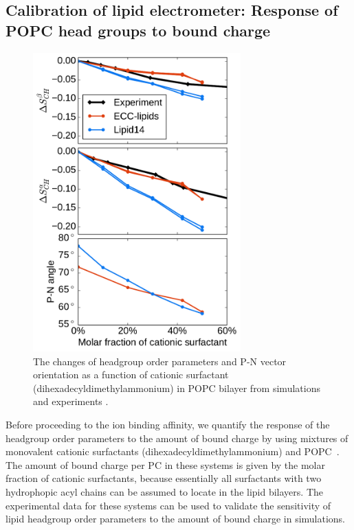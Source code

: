 \documentclass[aip,jcp,twocolumn]{revtex4}
\begin{document}

\subsection{Calibration of lipid electrometer:
            Response of POPC head groups to bound charge}\label{section:boundCHARGE}

\begin{figure}[tbp]
  \centering
  \includegraphics[width=8.0cm]{../Fig/ipython_nb/PN_angle_OrdPars-A-B_L14-ECCL17_q80_sig89_surf.pdf}
  \caption{\label{OrderParameterCHANGESsurf}
    The changes of headgroup order parameters and P-N vector orientation as a function of
    cationic surfactant (dihexadecyldimethylammonium) in POPC bilayer from simulations
    and experiments \cite{scherer89}.
  }
\end{figure}

Before proceeding to the ion binding affinity, we quantify
the response of the headgroup order parameters to the amount of 
bound charge by using mixtures of monovalent cationic
surfactants (dihexadecyldimethylammonium)
and POPC~\cite{scherer89}. The amount of bound charge per PC 
in these systems is given by the molar fraction of cationic 
surfactants, because essentially all surfactants with two hydrophopic
acyl chains can be assumed to locate in the lipid bilayers.
The experimental data for these systems can be used to validate 
the sensitivity of lipid headgroup order parameters
to the amount of bound charge in simulations.
\end{document}
